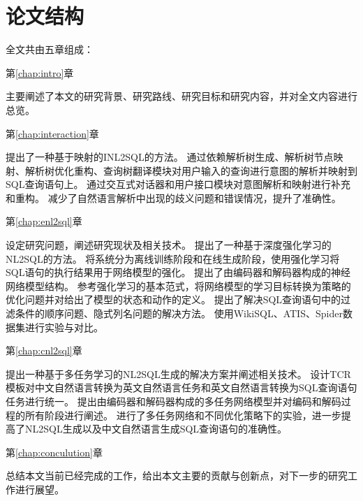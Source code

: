 \section{论文结构}
\label{intro:structure}
全文共由五章组成：

第\ref{chap:intro}章   


主要阐述了本文的研究背景、研究路线、研究目标和研究内容，并对全文内容进行总览。

第\ref{chap:interaction}章   

提出了一种基于映射的INL2SQL的方法。
通过依赖解析树生成、解析树节点映射、解析树优化重构、查询树翻译模块对用户输入的查询进行意图的解析并映射到SQL查询语句上。
通过交互式对话器和用户接口模块对意图解析和映射进行补充和重构。
减少了自然语言解析中出现的歧义问题和错误情况，提升了准确性。

第\ref{chap:enl2sql}章   

设定研究问题，阐述研究现状及相关技术。
提出了一种基于深度强化学习的NL2SQL的方法。
将系统分为离线训练阶段和在线生成阶段，使用强化学习将SQL语句的执行结果用于网络模型的强化。
提出了由编码器和解码器构成的神经网络模型结构。
参考强化学习的基本范式，将网络模型的学习目标转换为策略的优化问题并对给出了模型的状态和动作的定义。
提出了解决SQL查询语句中的过滤条件的顺序问题、隐式列名问题的解决方法。
使用WikiSQL、ATIS、Spider数据集进行实验与对比。

第\ref{chap:cnl2sql}章   

提出一种基于多任务学习的NL2SQL生成的解决方案并阐述相关技术。
设计TCR模板对中文自然语言转换为英文自然语言任务和英文自然语言转换为SQL查询语句任务进行统一。
提出由编码器和解码器构成的多任务网络模型并对编码和解码过程的所有阶段进行阐述。
进行了多任务网络和不同优化策略下的实验，进一步提高了NL2SQL生成以及中文自然语言生成SQL查询语句的准确性。

第\ref{chap:conculution}章   

总结本文当前已经完成的工作，给出本文主要的贡献与创新点，对下一步的研究工作进行展望。